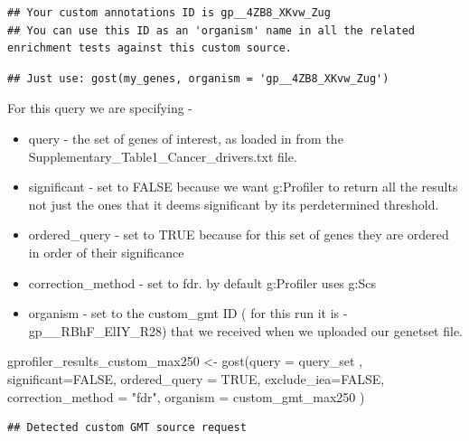 \documentclass[
]{book}
\newenvironment{Shaded}{\begin{snugshade}}{\end{snugshade}}
\newcommand{\AttributeTok}[1]{\textcolor[rgb]{0.77,0.63,0.00}{#1}}
\newcommand{\ConstantTok}[1]{\textcolor[rgb]{0.00,0.00,0.00}{#1}}
\newcommand{\FunctionTok}[1]{\textcolor[rgb]{0.00,0.00,0.00}{#1}}
\newcommand{\NormalTok}[1]{#1}
\newcommand{\OtherTok}[1]{\textcolor[rgb]{0.56,0.35,0.01}{#1}}
\newcommand{\StringTok}[1]{\textcolor[rgb]{0.31,0.60,0.02}{#1}}
\providecommand{\tightlist}{%
  \setlength{\itemsep}{0pt}\setlength{\parskip}{0pt}}
\begin{document}
\begin{verbatim}
## Your custom annotations ID is gp__4ZB8_XKvw_Zug
## You can use this ID as an 'organism' name in all the related enrichment tests against this custom source.
\end{verbatim}

\begin{verbatim}
## Just use: gost(my_genes, organism = 'gp__4ZB8_XKvw_Zug')
\end{verbatim}

For this query we are specifying -

\begin{itemize}
\tightlist
\item
  query - the set of genes of interest, as loaded in from the Supplementary\_Table1\_Cancer\_drivers.txt file.
\item
  significant - set to FALSE because we want g:Profiler to return all the results not just the ones that it deems significant by its perdetermined threshold.
\item
  ordered\_query - set to TRUE because for this set of genes they are ordered in order of their significance
\item
  correction\_method - set to fdr. by default g:Profiler uses g:Scs
\item
  organism - set to the custom\_gmt ID ( for this run it is - gp\_\_RBhF\_ElIY\_R28) that we received when we uploaded our genetset file.
\end{itemize}

\begin{Shaded}
\begin{Highlighting}[]
\NormalTok{gprofiler\_results\_custom\_max250 }\OtherTok{\textless{}{-}} \FunctionTok{gost}\NormalTok{(}\AttributeTok{query =}\NormalTok{ query\_set ,}
                                     \AttributeTok{significant=}\ConstantTok{FALSE}\NormalTok{,}
                                 \AttributeTok{ordered\_query =} \ConstantTok{TRUE}\NormalTok{,}
                                    \AttributeTok{exclude\_iea=}\ConstantTok{FALSE}\NormalTok{,}
                                     \AttributeTok{correction\_method =} \StringTok{"fdr"}\NormalTok{,}
                                 \AttributeTok{organism =}\NormalTok{ custom\_gmt\_max250}
\NormalTok{                                     )}
\end{Highlighting}
\end{Shaded}

\begin{verbatim}
## Detected custom GMT source request
\end{verbatim}
\end{document}
